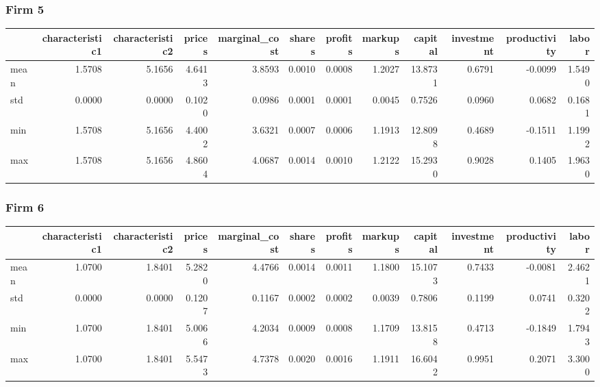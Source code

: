  \subsubsection*{Firm 5}
\begin{tabular}{lrrrrrrrrrrr}
\toprule
{} &  characteristic1 &  characteristic2 &  prices &  marginal\_cost &  shares &  profits &  markups &  capital &  investment &  productivity &  labor \\
\midrule
mean &           1.5708 &           5.1656 &  4.6413 &         3.8593 &  0.0010 &   0.0008 &   1.2027 &  13.8731 &      0.6791 &       -0.0099 & 1.5490 \\
std  &           0.0000 &           0.0000 &  0.1020 &         0.0986 &  0.0001 &   0.0001 &   0.0045 &   0.7526 &      0.0960 &        0.0682 & 0.1681 \\
min  &           1.5708 &           5.1656 &  4.4002 &         3.6321 &  0.0007 &   0.0006 &   1.1913 &  12.8098 &      0.4689 &       -0.1511 & 1.1992 \\
max  &           1.5708 &           5.1656 &  4.8604 &         4.0687 &  0.0014 &   0.0010 &   1.2122 &  15.2930 &      0.9028 &        0.1405 & 1.9630 \\
\bottomrule
\end{tabular}


 \subsubsection*{Firm 6}
\begin{tabular}{lrrrrrrrrrrr}
\toprule
{} &  characteristic1 &  characteristic2 &  prices &  marginal\_cost &  shares &  profits &  markups &  capital &  investment &  productivity &  labor \\
\midrule
mean &           1.0700 &           1.8401 &  5.2820 &         4.4766 &  0.0014 &   0.0011 &   1.1800 &  15.1073 &      0.7433 &       -0.0081 & 2.4621 \\
std  &           0.0000 &           0.0000 &  0.1207 &         0.1167 &  0.0002 &   0.0002 &   0.0039 &   0.7806 &      0.1199 &        0.0741 & 0.3202 \\
min  &           1.0700 &           1.8401 &  5.0066 &         4.2034 &  0.0009 &   0.0008 &   1.1709 &  13.8158 &      0.4713 &       -0.1849 & 1.7943 \\
max  &           1.0700 &           1.8401 &  5.5473 &         4.7378 &  0.0020 &   0.0016 &   1.1911 &  16.6042 &      0.9951 &        0.2071 & 3.3000 \\
\bottomrule
\end{tabular}


